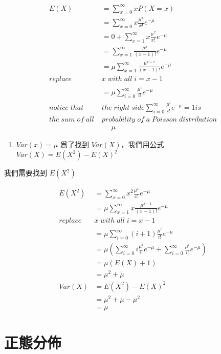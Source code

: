 \documentclass[]{ctexbook}
\providecommand{\tightlist}{%
  \setlength{\itemsep}{0pt}\setlength{\parskip}{0pt}}
\begin{document}
\begin{align}
E(X)  &=  \sum_{x=0}^\infty xP(X=x) \\
      &=  \sum_{x=0}^\infty x\frac{\mu^x}{x!}e^{-\mu} \\
      &= 0+ \sum_{x=1}^\infty x\frac{\mu^x}{x!}e^{-\mu} \\
      &=  \sum_{x=1}^\infty \frac{\mu^x}{(x-1)!}e^{-\mu} \\
      &=  \mu\sum_{x=1}^\infty \frac{\mu^{x-1}}{(x-1)!}e^{-\mu} \\
replace\; &x\; with\; all\; i=x-1 \\
      &=  \mu\sum_{i=0}^\infty \frac{\mu^{i}}{i!}e^{-\mu} \\
notice\; that\; &the\; right\; side \sum_{i=0}^\infty \frac{\mu^{i}}{i!}e^{-\mu}=1 is \\
the\;sum\;of\;all\;&probability\;of\;a\;Poisson\;distribution\\
      &= \mu
\end{align}

\begin{enumerate}
\def\labelenumi{\arabic{enumi}.}
\setcounter{enumi}{1}
\tightlist
\item
  \(Var(x)=\mu\) 爲了找到 \(Var(X)\)，我們用公式
  \(Var(X)=E(X^2)-E(X)^2\)
\end{enumerate}

我們需要找到 \(E(X^2)\)

\begin{align}
E(X^2) &= \sum_{x=0}^\infty x^2\frac{\mu^x}{x!}e^{-\mu} \\
       &= \mu \sum_{x=1}^\infty x\frac{\mu^{x-1}}{(x-1)!}e^{-\mu} \\
replace\; &x\; with\; all\; i=x-1 \\
       &= \mu \sum_{i=0}^\infty (i+1)\frac{\mu^{i}}{i!}e^{-\mu} \\
       &= \mu(\sum_{i=0}^\infty i\frac{\mu^i}{i!}e^{-\mu} + \sum_{i=0}^\infty \frac{\mu^i}{i!}e^{-\mu}) \\
       &= \mu(E(X)+1) \\
       &= \mu^2+\mu \\
Var(X) &= E(X^2) - E(X)^2 \\
       &= \mu^2 + \mu -\mu^2 \\
       &= \mu
\end{align}

\chapter{正態分佈}
\end{document}
